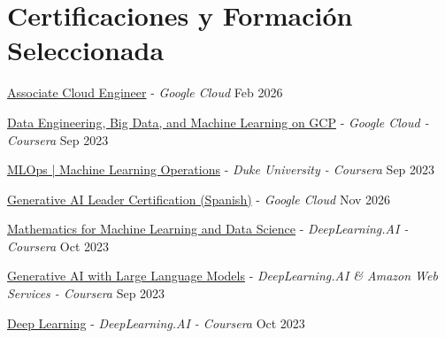 \documentclass[letter,10pt]{article}
\begin{document}
\section{Certif{}icaciones y Formación Seleccionada}
\begin{zitemize}
    \item \href{https://www.credly.com/badges/adc543d1-0d0a-42cf-9b76-f09412427cd1}{Associate Cloud Engineer} - \textit{Google Cloud} \hfill Feb 2026
    \item \href{https://www.coursera.org/account/accomplishments/specialization/94N7VQDPURXZ}{Data Engineering, Big Data, and Machine Learning on GCP} - \textit{Google Cloud - Coursera} \hfill Sep 2023
    \item \href{https://www.coursera.org/account/accomplishments/specialization/TQAEV5VXPVRC}{MLOps | Machine Learning Operations} - \textit{Duke University - Coursera} \hfill Sep 2023
    \item \href{https://www.credly.com/badges/6cf3e9ab-4273-437c-b1a1-de7fd75c58f8}{Generative AI Leader Certification (Spanish)} - \textit{Google Cloud} \hfill Nov 2026
    \item \href{https://www.coursera.org/account/accomplishments/specialization/YV2XYVC2GGS3}{Mathematics for Machine Learning and Data Science} - \textit{DeepLearning.AI - Coursera} \hfill Oct 2023
    \item \href{https://www.coursera.org/account/accomplishments/verify/9RVETDFCQ98N}{Generative AI with Large Language Models} - \textit{DeepLearning.AI \& Amazon Web Services - Coursera} \hfill Sep 2023
    \item \href{https://www.coursera.org/account/accomplishments/specialization/4NN6BWAJ6Y9C}{Deep Learning} - \textit{DeepLearning.AI - Coursera} \hfill Oct 2023
\end{zitemize}
\end{document}

